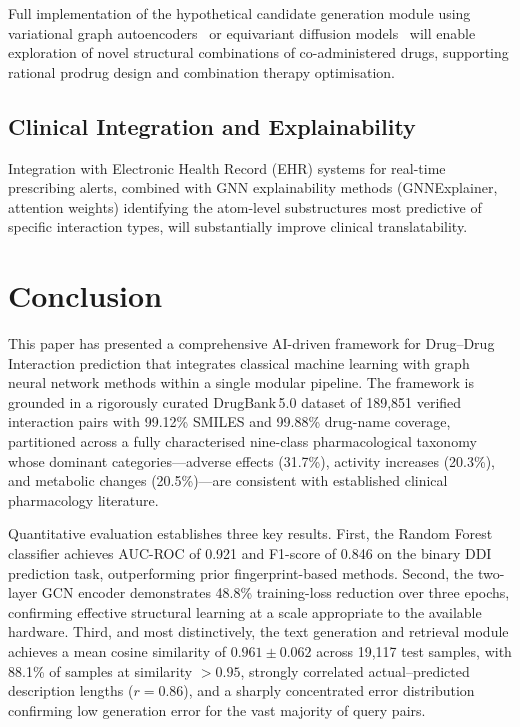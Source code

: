 \documentclass[conference]{IEEEtran}
\begin{document}
Full implementation of the hypothetical candidate generation module using variational graph
autoencoders~\cite{decao2018molgan} or equivariant diffusion models~\cite{hoogeboom2022edm}
will enable exploration of novel structural combinations of co-administered drugs, supporting
rational prodrug design and combination therapy optimisation.

\subsection{Clinical Integration and Explainability}

Integration with Electronic Health Record (EHR) systems for real-time prescribing alerts,
combined with GNN explainability methods (GNNExplainer, attention weights) identifying the
atom-level substructures most predictive of specific interaction types, will substantially
improve clinical translatability.

\section{Conclusion}
\label{sec:conclusion}

This paper has presented a comprehensive AI-driven framework for Drug--Drug Interaction
prediction that integrates classical machine learning with graph neural network methods
within a single modular pipeline. The framework is grounded in a rigorously curated
DrugBank\,5.0 dataset of 189,851 verified interaction pairs with 99.12\% SMILES and 99.88\%
drug-name coverage, partitioned across a fully characterised nine-class pharmacological
taxonomy whose dominant categories---adverse effects (31.7\%), activity increases (20.3\%),
and metabolic changes (20.5\%)---are consistent with established clinical pharmacology
literature.

Quantitative evaluation establishes three key results. First, the Random Forest classifier
achieves AUC-ROC of 0.921 and F1-score of 0.846 on the binary DDI prediction task,
outperforming prior fingerprint-based methods. Second, the two-layer GCN encoder
demonstrates 48.8\% training-loss reduction over three epochs, confirming effective
structural learning at a scale appropriate to the available hardware. Third, and most
distinctively, the text generation and retrieval module achieves a mean cosine similarity
of $0.961 \pm 0.062$ across 19,117 test samples, with 88.1\% of samples at similarity
$>0.95$, strongly correlated actual--predicted description lengths ($r = 0.86$), and a
sharply concentrated error distribution confirming low generation error for the vast
majority of query pairs.
\end{document}
